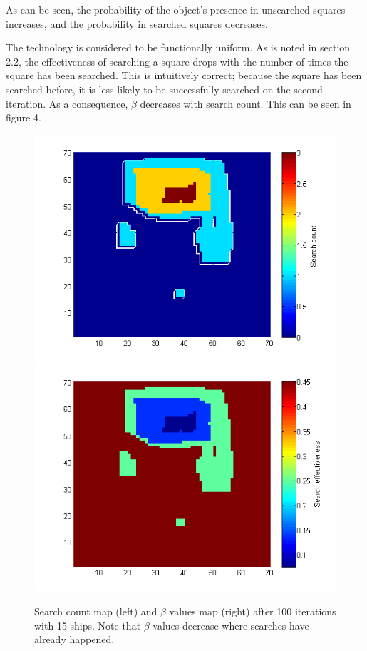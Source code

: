 \documentclass[a4paper]{article}
\begin{document}
As can be seen, the probability of the object's presence in unsearched squares increases, and the probability in searched squares decreases. 

The technology is considered to be functionally uniform. As is noted in section 2.2, the effectiveness of searching a square drops with the number of times the square has been searched. This is intuitively correct; because the square has been searched before, it is less likely to be successfully searched on the second iteration. As a consequence, $\beta$ decreases with search count. This can be seen in figure 4.

\begin{figure}[H]\begin{center}
\includegraphics[scale=0.5]{../Matlab/Images/After100SearchCount.png}
\includegraphics[scale=0.5]{../Matlab/Images/After100SearchEffectiveness.png}
\caption{Search count map (left) and $\beta$ values map (right) after 100 iterations with 15 ships. Note that $\beta$ values decrease where searches have already happened.}
\end{center}\end{figure}
\end{document}
